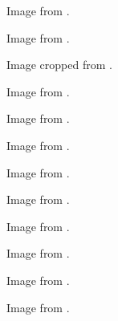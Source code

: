 	\begin{minipage}{\textwidth}
		Image from \cite{grilledCheese}.
	\end{minipage}

	\begin{minipage}{\textwidth}
		Image from \cite{panini}.
	\end{minipage}

	\begin{minipage}{\textwidth}
		Image cropped from \cite{subSandwich}.
	\end{minipage}

	\begin{minipage}{\textwidth}
		Image from \cite{hamburger}.
	\end{minipage}

	\begin{minipage}{\textwidth}
		Image from \cite{hotdog}.
	\end{minipage}

	\begin{minipage}{\textwidth}
		Image from \cite{iceCreamSandwich}.
	\end{minipage}

	\begin{minipage}{\textwidth}
		Image from \cite{burrito}.
	\end{minipage}

	\begin{minipage}{\textwidth}
		Image from \cite{taco}.
	\end{minipage}

	\begin{minipage}{\textwidth}
		Image from \cite{calzone}.
	\end{minipage}

	\begin{minipage}{\textwidth}
		Image from \cite{quesadilla}.
	\end{minipage}

	\begin{minipage}{\textwidth}
		Image from \cite{openFaced}.
	\end{minipage}

	\begin{minipage}{\textwidth}
		Image from \cite{pizza}.
	\end{minipage}

